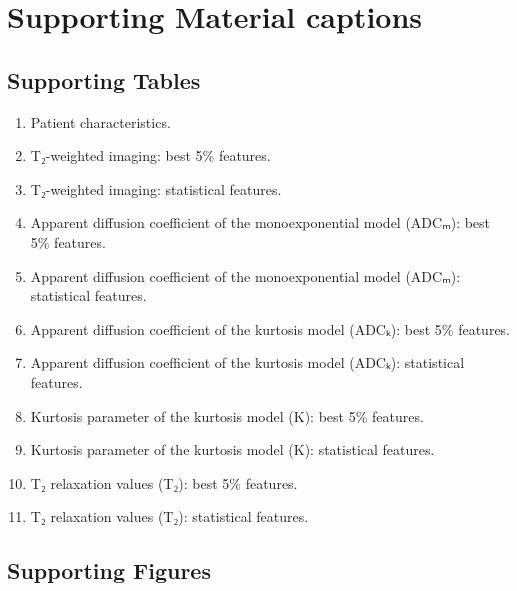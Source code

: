 \newcommand{\fig}[2]{\item Patient #1: #2 map, prostate mask, lesion masks.}
\newcommand{\figADCm}[1]{\fig{#1}{ADCₘ}}
\newcommand{\figTtw}[1]{\fig{#1}{T₂w}}
\newcommand{\figTt}[1]{\fig{#1}{T₂}}

\newcommand{\histology}[2]{\item Patient #1: #2.}
\newcommand{\pink}[1]{\histology{#1}{prostatectomy section}}


\section{Supporting Material captions}

\subsection{Supporting Tables}

\begin{enumerate}
\item Patient characteristics.
\item T₂-weighted imaging: best 5\% features.
\item T₂-weighted imaging: statistical features.
\item Apparent diffusion coefficient of the monoexponential model (ADCₘ): best
  5\% features.
\item Apparent diffusion coefficient of the monoexponential model (ADCₘ):
  statistical features.
\item Apparent diffusion coefficient of the kurtosis model (ADCₖ): best 5\%
  features.
\item Apparent diffusion coefficient of the kurtosis model (ADCₖ): statistical
  features.
\item Kurtosis parameter of the kurtosis model (K): best 5\% features.
\item Kurtosis parameter of the kurtosis model (K): statistical features.
\item T₂ relaxation values (T₂): best 5\% features.
\item T₂ relaxation values (T₂): statistical features.
\end{enumerate}


\subsection{Supporting Figures}

